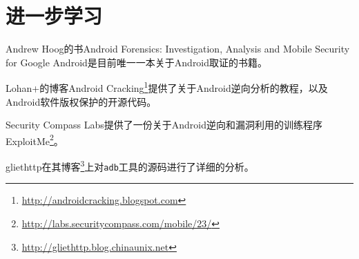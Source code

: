 \chapter{进一步学习}

Andrew Hoog的书Android Forensics: Investigation, Analysis and Mobile Security for Google Android是目前唯一一本关于Android取证的书籍。

Lohan+的博客Android Cracking\footnote{\url{http://androidcracking.blogspot.com}}提供了关于Android逆向分析的教程，以及Android软件版权保护的开源代码。

Security Compass Labs提供了一份关于Android逆向和漏洞利用的训练程序ExploitMe\footnote{\url{http://labs.securitycompass.com/mobile/23/}}。

gliethttp在其博客\footnote{\url{http://gliethttp.blog.chinaunix.net}}上对\lstinline!adb!工具的源码进行了详细的分析。

